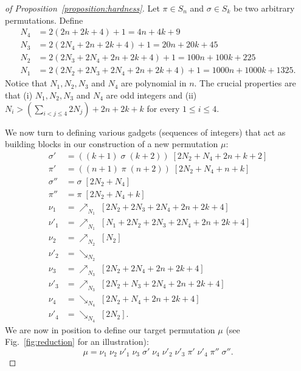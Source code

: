 \documentclass[a4paper]{llncs}
\begin{document}
\begin{proof}[of Proposition~\ref{proposition:hardness}]
  Let $\pi \in S_n$ and $\sigma \in S_k$ be two arbitrary permutations.
  Define
  \begin{align*}
  N_4 &= 2(2n + 2k + 4) + 1  = 4n + 4k + 9 \\
  N_3 &= 2(2N_4 + 2n + 2k + 4) + 1 = 20n + 20k + 45 \\
  N_2 &= 2(2N_3 + 2N_4 + 2n + 2k + 4) + 1 = 100n + 100k + 225 \\
  N_1 &= 2(2N_2 + 2N_3 + 2N_4 + 2n + 2k + 4) + 1 = 1000n + 1000k  + 1325\text{.}
  \end{align*}
  Notice that $N_1, N_2, N_3$ and $N_4$ are polynomial in $n$.
  The crucial properties are that
  (i) $N_1, N_2, N_3$ and $N_4$ are odd integers
  and
  (ii) $N_i > \left(\sum_{i < j \leq 4} 2N_j\right) + 2n + 2k + k$
  for every $1 \leq i \leq 4$.

  We now turn to defining various gadgets (sequences of integers)
  that act as building blocks in our construction of a new permutation $\mu$:
  \begin{align*}
  \sigma'  &= ((k+1) \; \sigma \; (k+2)) \; [2N_2 + N_4 + 2n + k + 2] \\
  \pi'     &= ((n+1) \; \pi \; (n+2)) \; [2N_2 + N_4 + n + k] \\
  \sigma'' &= \sigma \; [2N_2 + N_4] \\
  \pi''    &= \pi \; [2N_2 + N_4 + k] \\
  \nu_1    &= \nearrow_{N_1} \; [2N_2 + 2N_3 + 2N_4 + 2n + 2k + 4] \\
  \nu'_1   &= \nearrow_{N_1} \; [N_1 + 2N_2 + 2N_3 + 2N_4 + 2n + 2k + 4] \\
  \nu_2    &= \nearrow_{N_2} \; [N_2] \\
  \nu'_2   &= \searrow_{N_2} \\
  \nu_3    &= \nearrow_{N_3} \; [2N_2 + 2N_4 + 2n + 2k + 4] \\
  \nu'_3   &= \nearrow_{N_3} \; [2N_2 + N_3 + 2N_4 + 2n + 2k + 4] \\
  \nu_4    &= \searrow_{N_4} \; [2N_2 + N_4 + 2n + 2k + 4] \\
  \nu'_4   &= \searrow_{N_4} \; [2N_2]\text{.}
  \end{align*}
  We are now in position to define our target permutation $\mu$
  (see Fig.~\ref{fig:reduction} for an illustration):
  $$
  \mu
  =
  \nu_1 \; \nu_2 \; \nu'_1 \; \nu_3 \; \sigma' \; \nu_4 \; \nu'_2 \; \nu'_3 \; \pi' \; \nu'_4 \; \pi'' \; \sigma''
  \text{.}
  $$


\end{proof}
\end{document}
